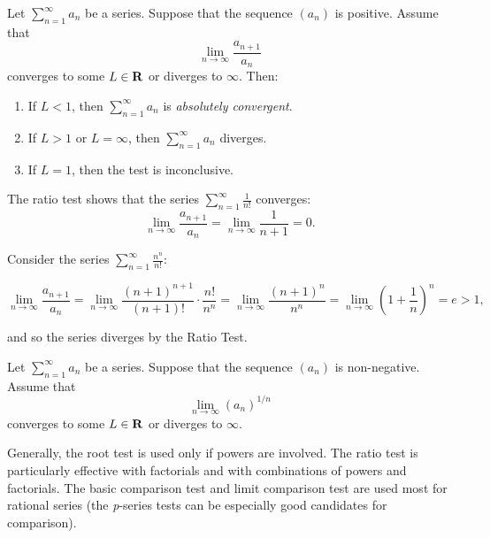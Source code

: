 \documentclass{article}
\begin{document}
      \begin{prop}
        \everymath{\displaystyle}
        Let \(\sum_{n=1}^{\infty}a_n\) be a series. Suppose that the sequence \((a_n)\) is positive. Assume that 
        \[
          \lim_{n \to \infty}\frac{a_{n+1}}{a_n}
        \]
        converges to some \(L \in \mathbf{R}\) or diverges to \(\infty\).
        Then:
        \begin{enumerate}
          \item If \(L < 1\), then \(\sum_{n=1}^{\infty}a_n\) is \emph{absolutely convergent}.
          \item If \(L > 1\) or \(L = \infty\), then \(\sum_{n=1}^{\infty}a_n\) diverges.
          \item If \(L = 1\), then the test is inconclusive.
        \end{enumerate}
      \end{prop}

      \begin{eg}
        \everymath{\displaystyle}
        The ratio test shows that the series \(\sum_{n=1}^{\infty}\frac{1}{n!}\) converges:
        \[
          \lim_{n \to \infty}\frac{a_{n+1}}{a_n} = \lim_{n \to \infty}\frac{1}{n+1} = 0.
        \]
      \end{eg}

      \begin{eg}
        \everymath{\displaystyle}
        Consider the series \(\sum_{n = 1}^{\infty}\frac{n^n}{n!}\):

        \[
          \lim_{n \to \infty}\frac{a_{n+1}}{a_n} = \lim_{n \to \infty}\frac{(n+1)^{n+1}}{(n+1)!} \cdot \frac{n!}{n^n} = \lim_{n \to \infty}\frac{(n+1)^{n}}{n^n} = \lim_{n \to \infty}\left(1 + \frac{1}{n}\right)^n = e > 1,
        \]

        and so the series diverges by the Ratio Test.
      \end{eg}

      \begin{prop}
        Let \(\sum_{n=1}^{\infty}a_n\) be a series. Suppose that the sequence \((a_n)\) is non-negative. Assume that 
        \[
          \lim_{n \to \infty}(a_n)^{1/n}
        \]
        converges to some \(L \in \mathbf{R}\) or diverges to \(\infty\).
      \end{prop}

      \begin{note}
        Generally, the root test is used only if powers are involved. The ratio test is particularly effective with factorials and with combinations of powers and factorials. The basic comparison test and limit comparison test are used most for rational series (the \emph{p}-series tests can be especially good candidates for comparison). 
      \end{note}
\end{document}
